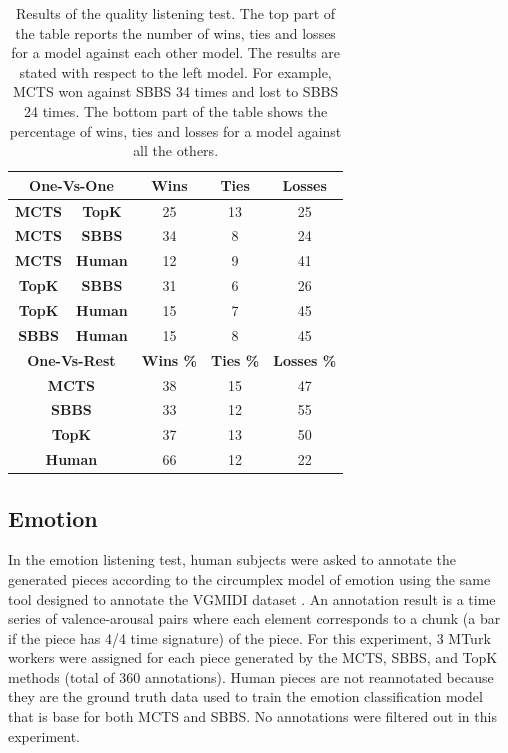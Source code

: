\begin{table}[h]
    \centering
    \begin{tabular}{ccccc}
    \toprule
   \multicolumn{2}{c}{\textbf{One-Vs-One}} & \textbf{Wins} & \textbf{Ties} & \textbf{Losses} \\
    \midrule
    \textbf{MCTS} & \textbf{TopK } & 25 & 13 & 25 \\
    \textbf{MCTS} & \textbf{SBBS } & 34 & 8  & 24 \\
    \textbf{MCTS} & \textbf{Human} & 12 & 9  & 41 \\
    \textbf{TopK} & \textbf{SBBS } & 31 & 6  & 26 \\
    \textbf{TopK} & \textbf{Human} & 15 & 7  & 45 \\
    \textbf{SBBS} & \textbf{Human} & 15 & 8  & 45 \\
    \midrule
    \multicolumn{2}{c}{\textbf{One-Vs-Rest}} & \textbf{Wins \%} & \textbf{Ties \%} & \textbf{Losses \%}  \\
    \midrule
    \multicolumn{2}{c}{\textbf{MCTS}} & 38 & 15 & 47  \\
    \multicolumn{2}{c}{\textbf{SBBS}} & 33 & 12 & 55  \\
    \multicolumn{2}{c}{\textbf{TopK}} & 37 & 13 & 50 \\
    \multicolumn{2}{c}{\textbf{Human}} & 66 & 12 & 22 \\
    \bottomrule
    \end{tabular}
    \caption{Results of the quality listening test. The top part of the table reports the number of wins, ties and losses for a model against each other model. The results are stated with respect to the left model. For example, MCTS won against SBBS 34 times and lost to SBBS 24 times. The bottom part of the table shows the percentage of wins, ties and losses for a model against all the others.}
    \label{tab:quality}
\end{table}

\subsection{Emotion}

In the emotion listening test, human subjects were asked to annotate the generated pieces according to the circumplex model of emotion using the same tool designed to annotate the VGMIDI dataset \cite{ferreira_2019}. An annotation result is a time series of valence-arousal pairs where each element corresponds to a chunk (a bar if the piece has 4/4 time signature) of the piece. For this experiment, 3 MTurk workers were assigned for each piece generated by the MCTS, SBBS, and TopK methods (total of 360 annotations). Human pieces are not reannotated because they are the ground truth data used to train the emotion classification model that is base for both MCTS and SBBS. No annotations were filtered out in this experiment.

